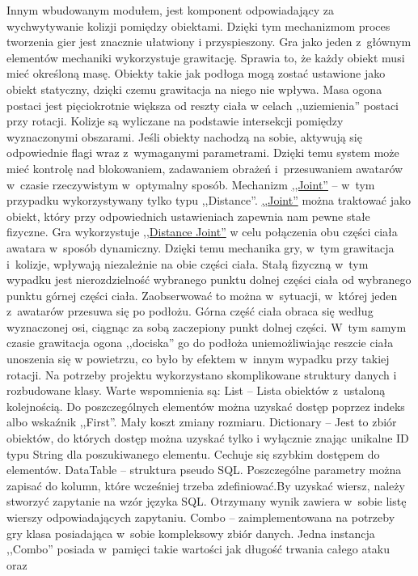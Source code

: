\documentclass[brudnopis]{xmgr}
\begin{document}
Innym wbudowanym modułem, jest komponent
odpowiadający za wychwytywanie kolizji pomiędzy obiektami. Dzięki tym
mechanizmom proces tworzenia gier jest znacznie ułatwiony i
przyspieszony.
Gra jako jeden z~głównym elementów mechaniki wykorzystuje grawitację. Sprawia
to, że każdy obiekt musi
mieć określoną masę. Obiekty takie jak podłoga mogą zostać ustawione jako
obiekt statyczny, dzięki
czemu grawitacja na niego nie wpływa. Masa ogona postaci jest
pięciokrotnie większa od reszty ciała w
celach ,,uziemienia'' postaci przy rotacji.
Kolizje są wyliczane na podstawie intersekcji pomiędzy wyznaczonymi
obszarami. Jeśli obiekty
nachodzą na sobie, aktywują się odpowiednie flagi wraz z~wymaganymi
parametrami. Dzięki temu system
może mieć kontrolę nad blokowaniem, zadawaniem obrażeń i~przesuwaniem
awatarów w~czasie
rzeczywistym w~optymalny sposób.
Mechanizm \hyperref[slownik]{,,Joint''} -- w~tym przypadku wykorzystywany tylko typu ,,Distance''. \hyperref[slownik]{,,Joint''} można
traktować jako obiekt, który
przy odpowiednich ustawieniach zapewnia nam pewne stałe fizyczne. Gra
wykorzystuje \hyperref[slownik]{,,Distance Joint''} w celu połączenia obu części ciała awatara w~sposób dynamiczny. Dzięki
temu mechanika gry, w~tym
grawitacja i~kolizje, wpływają niezależnie na obie części ciała. Stałą
fizyczną w~tym wypadku jest
nierozdzielność wybranego punktu dolnej części ciała od wybranego punktu
górnej części ciała.
Zaobserwować to można w~sytuacji, w~której jeden z~awatarów przesuwa się
po podłożu. Górna część
ciała obraca się według wyznaczonej osi, ciągnąc za sobą zaczepiony punkt
dolnej części. W~tym
samym czasie grawitacja ogona ,,dociska'' go do podłoża uniemożliwiając
reszcie ciała unoszenia się w
powietrzu, co było by efektem w~innym wypadku przy takiej rotacji.
Na potrzeby projektu wykorzystano skomplikowane struktury danych i
rozbudowane klasy. Warte wspomnienia są:
List -- Lista obiektów z~ustaloną kolejnością. Do poszczególnych elementów
można uzyskać dostęp poprzez indeks albo wskaźnik ,,First''. Mały koszt
zmiany rozmiaru.
Dictionary -- Jest to zbiór obiektów, do których dostęp można uzyskać tylko
i wyłącznie znając unikalne ID typu String dla poszukiwanego elementu.
Cechuje się szybkim dostępem do elementów.
DataTable -- struktura pseudo SQL. Poszczególne parametry można zapisać do
kolumn, które wcześniej trzeba zdefiniować.By uzyskać wiersz, należy
stworzyć zapytanie na wzór języka SQL. Otrzymany
wynik zawiera w~sobie listę wierszy odpowiadających zapytaniu.
Combo -- zaimplementowana na potrzeby gry klasa posiadająca w~sobie
kompleksowy zbiór danych. Jedna instancja ,,Combo'' posiada w~pamięci takie
wartości jak długość trwania całego ataku oraz
\end{document}
